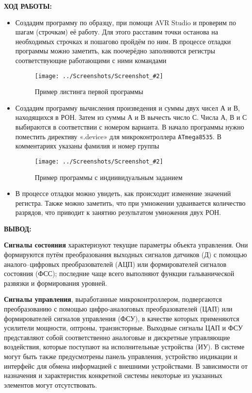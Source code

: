 \documentclass[14pt,a4paper]{extreport}
\newcommand{\sshot}[2]{\begin{figure}[ht]%
\centering\texttt{[image: ../Screenshots/Screenshot\_\#2]}%
\caption{#1}%
\label{sshot#2}%
\end{figure}%
}
\newcommand{\header}[1]{%
{
\clearpage%
\fontsize{16pt}{14pt}\selectfont
\begin{center}
\textbf{\MakeUppercase{#1}:}
\end{center}
}
}
\begin{document}
\header{Ход работы}


\begin{itemize}

\item Создадим программу по образцу, при помощи AVR Studio и проверим по шагам (строчкам) её работу. Для этого расставим точки останова на необходимых строчках и пошагово пройдём по ним. В процессе отладки программы можно заметить, как поочерёдно заполняются регистры соответствующие работающими с ними командами

\sshot{Пример листинга первой программы}{1}

\item Создадим программу вычисления произведения и суммы двух чисел А и В, находящихся в РОН. Затем из суммы А и В вычесть число С. Числа А, В и С выбираются в соответствии с номером варианта. В начало программы нужно поместить директиву «.device» для микроконтроллера \texttt{ATmega8535}. В комментариях указаны фамилия и номер группы

\sshot{Пример программы с индиивидуальным заданием}{2}

\item В процессе отладки можно увидеть, как происходит изменение значений регистра. Также можно заметить, что при умножении удваивается количество разрядов, что приводит к занятию результатом умножения двух РОН.

\end{itemize}

\header{Вывод}


\textbf{Сигналы состояния} характеризуют текущие параметры объекта управления. Они формируются путём преобразования выходных сигналов датчиков (Д) с помощью \\ аналого--цифровых преобразователей (АЦП) или формирователей сигналов состояния (ФСС); последние чаще всего выполняют функции гальванической развязки и формирования уровней.

\par

\textbf{Сигналы управления}, выработанные микроконтроллером, подвергаются преобразованию с помощью цифро-аналоговых преобразователей (ЦАП) или формирователей сигналов управления (ФСУ), в качестве которых применяются усилители мощности, оптроны, транзисторные. Выходные сигналы ЦАП и ФСУ представляют собой соответственно аналоговые и дискретные управляющие воздействия, которые поступают на исполнительные устройства (ИУ). В системе могут быть также предусмотрены панель управления, устройство индикации и интерфейс для обмена информацией с внешними устройствами. В зависимости от назначения и характеристик конкретной системы некоторые из указанных элементов могут отсутствовать.
\end{document}
